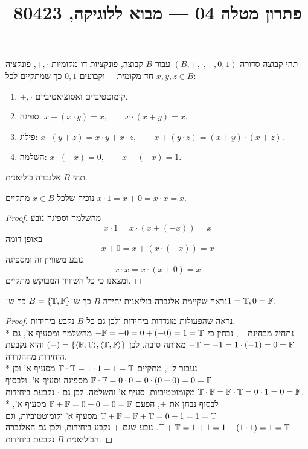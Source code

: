 
\title{פתרון מטלה 04 --- מבוא ללוגיקה, 80423}


\maketitle
\maketitleprint{}

\Question{}
\begin{definition}
	תהי קבוצה סדורה $(B, +, \cdot, -, 0, 1)$ עבור $B$ קבוצה, פונקציות דו־מקומיות $+, \cdot$, פונקציה חד־מקומית $-$ וקבועים $0, 1$ כך שמתקיים לכל $x, y, z \in B$:
	\begin{enumerate}
		\item $+, \cdot$ קומוטטיביים ואסוציאטיביים.
		\item ספיגה: $x + (x \cdot y) = x, \qquad x \cdot (x + y) = x$.
		\item פילוג: $x \cdot (y + z) = x \cdot y + x \cdot z, \qquad x + (y \cdot z) = (x + y) \cdot (x + z)$.
		\item השלמה: $x \cdot (-x) = 0, \qquad x + (-x) = 1$.
	\end{enumerate}
\end{definition}
תהי $B$ אלגברה בוליאנית.

\Subquestion{}
נוכיח שלכל $x \in B$ מתקיים $x \cdot 1 = x + 0 = x \cdot x = x$.
\begin{proof}
	מהשלמה וספיגה נובע
	\[
		x \cdot 1 = x \cdot (x + (-x)) = x
	\]
	באופן דומה
	\[
		x + 0 = x + (x \cdot (-x)) = x
	\]
	נובע משוויון זה ומספיגה
	\[
		x \cdot x = x \cdot (x + 0) = x
	\]
	ומצאנו כי כל השוויון המבוקש מתקיים.
\end{proof}

\Subquestion{}
נראה שקיימת אלגברה בוליאנית יחידה $B$ כך ש־$B = \{ \mathbb{T}, \mathbb{F} \}$ כך ש־$1 = \mathbb{T}, 0 = \mathbb{F}$.
\begin{proof}
	נראה שהפעולות מוגדרות ביחידות ולכן גם כל $B$ נקבע ביחידות. \\*
	נתחיל מבחינת $-$, נבחין כי $-\mathbb{F} = -0 = 0 + (-0) = 1 = \mathbb{T}$ מהשלמה ומסעיף א', גם $-\mathbb{T} = -1 = 1 \cdot (-1) = 0 = \mathbb{F}$ מאותה סיבה.
	לכן $(-) = \{ \langle \mathbb{F}, \mathbb{T} \rangle, \langle \mathbb{T}, \mathbb{F} \rangle\}$ והיא נקבעת היחידות מההגדרה. \\*
	נעבור ל־$\cdot$, מתקיים $\mathbb{T} \cdot \mathbb{T} = 1 \cdot 1 = 1 = \mathbb{T}$ מסעיף א' וכן $\mathbb{F} \cdot \mathbb{F} = 0 \cdot 0 = 0 \cdot (0 + 0) = 0 = \mathbb{F}$ מספיגה וסעיף א',
	ולבסוף $\mathbb{T} \cdot \mathbb{F} = \mathbb{F} \cdot \mathbb{T} = 0 \cdot 1 = 0 = \mathbb{F}$ מקומוטטיביות, סעיף א' והשלמה.
	לכן גם $\cdot$ נקבעת ביחידות. \\*
	לבסוף נבחן את $+$, הפעם $\mathbb{F} + \mathbb{F} = 0 + 0 = 0 = \mathbb{F}$ מסעיף א', $\mathbb{T} + \mathbb{F} = \mathbb{F} + \mathbb{T} = 0 + 1 = 1 = \mathbb{T}$ מסעיף א' וקומוטטיביות, וגם $\mathbb{T} + \mathbb{T} = 1 + 1 = 1 + (1 \cdot 1) = 1 = \mathbb{T}$.
	נובע שגם $+$ נקבע ביחידות, ולכן גם האלגברה הבוליאנית $B$ נקבעת ביחידות.
\end{proof}

